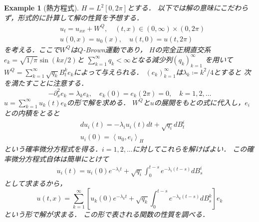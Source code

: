 \documentclass[dvipdfmx,autodetect-engine]{jsarticle}
\newtheorem{example}{Example}[section]
\theoremstyle{remark}
\theoremstyle{definition}
\newcommand{\paren}[1]{\left( #1 \right)}
\newcommand{\iprod}[1]{\left\langle #1 \right\rangle}
\begin{document}
\begin{example}[熱方程式]
    $H = L^{2}[0,2\pi]$とする．
    以下では解の意味にこだわらず，形式的に計算して解の性質を予想する．
    \begin{align}
        &u_{t} = u_{xx} + W^{Q},\quad (t,x) \in (0,\infty)\times (0,2\pi)\\
        &u(0,x) = u_{0}(x),\quad u(t,0)=u(t,2\pi)
    \end{align}
    を考える．ここで$W^{Q}$は$Q$-Brown運動であり，
    $H$の完全正規直交系$e_{k} = \sqrt{1/\pi} \sin{\paren{kx/2}}$と
    $\sum_{k=1}^{\infty} q_{k} <\infty$となる減少列$(q_{k})_{k=1}^{\infty}$
    を用いて$W^{Q} = \sum_{k=1}^{\infty} \sqrt{q_{k}} B_{t}^{k} e_{k}$によって与えられる．
    $(e_{k})_{k=1}^{\infty}$は$\lambda_{k} \coloneqq k^{2}/4$とすると
    次を満たすことに注意する．
    \begin{equation}
        -\partial_{x}^{2} e_{k} = \lambda_{k} e_{k},\quad e_{k}(0) = e_{k}(2\pi) = 0,\quad
        k=1,2,\ldots
    \end{equation}
    $u=\sum_{k=1}^{\infty} u_{k}(t) e_{k}$の形で解を求める．
    $W^{Q}$と$u$の展開をもとの式に代入し，$e_{i}$との内積をとると
    \begin{align}
        &du_{i}(t) = -\lambda_{i} u_{i}(t)dt + \sqrt{q_{i}} dB_{t}^{i}\\
        &u_{i}(0) = \iprod{u_{0},e_{i}}_{H}
    \end{align}
    という確率微分方程式を得る．$i=1,2,\ldots$に対してこれらを解けばよい．
    この確率微分方程式自体は簡単にとけて
    \begin{align}
        u_{i}(t) = u_{i}(0) e^{-\lambda_{i}t} + 
        \sqrt{q_{i}} \int_{0}^{t-s} e^{-\lambda_{i}(t-s)}dB_{s}^{i}
    \end{align}
    として求まるから，
    \begin{equation}
        u(t,x) = \sum_{k=1}^{\infty} 
        \left[
        u_{k}(0) e^{-\lambda_{k}t} + 
        \sqrt{q_{k}} \int_{0}^{t-s} e^{-\lambda_{k}(t-s)}dB_{s}^{k}
        \right]e_{k}
    \end{equation}
    という形で解が求まる．
    この形で表される関数の性質を調べる．

\end{example}
\end{document}
